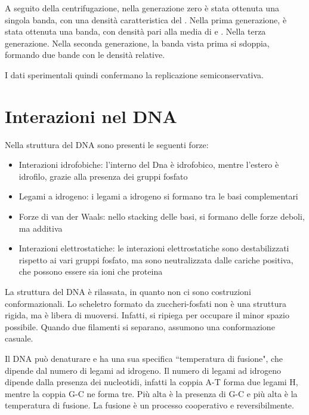 
A seguito della centrifugazione, nella generazione zero è stata ottenuta una singola banda, con una densità caratteristica del . Nella prima generazione, è stata ottenuta una banda, con densità pari alla media di  e . Nella terza generazione. Nella seconda generazione, la banda vista prima si sdoppia, formando due bande con le densità relative.


I dati sperimentali quindi confermano la replicazione semiconservativa.

\section{Interazioni nel DNA}

Nella struttura del DNA sono presenti le seguenti forze:
\begin{itemize}
\item Interazioni idrofobiche: l'interno del Dna è idrofobico, mentre l'estero è idrofilo, grazie alla presenza dei gruppi fosfato
\item Legami a idrogeno: i legami a idrogeno si formano tra le basi complementari
\item Forze di van der Waals: nello stacking delle basi, si formano delle forze deboli, ma additiva
\item Interazioni elettrostatiche: le interazioni elettrostatiche sono destabilizzati rispetto ai vari gruppi fosfato, ma sono neutralizzata dalle cariche positiva, che possono essere sia ioni che proteina
\end{itemize}

La struttura del DNA è rilassata, in quanto non ci sono costruzioni conformazionali. Lo scheletro formato da zuccheri-fosfati non è una struttura rigida, ma è libera di muoversi. Infatti, si ripiega per occupare il minor spazio possibile. Quando due filamenti si separano, assumono una conformazione casuale.



Il DNA può denaturare e ha una sua specifica ``temperatura di fusione", che dipende dal numero di legami ad idrogeno. Il numero di legami ad idrogeno dipende dalla presenza dei nucleotidi, infatti la coppia A-T forma due legami H, mentre la coppia G-C ne forma tre. Più alta è la presenza di G-C e più alta è la temperatura di fusione.
La fusione è un processo cooperativo e reversibilmente.

